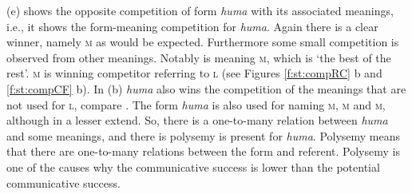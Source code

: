  (e) shows the opposite competition of form {\it huma} with its associated meanings, i.e., it shows the form-meaning competition for {\it huma}. Again there is a clear winner, namely {\scshape m} as would be expected. Furthermore some small competition is observed from other meanings. Notably is meaning {\scshape m}, which is `the best of the rest'. {\scshape m} is winning competitor referring to {\scshape l} (see Figures \ref{f:st:compRC} b and \ref{f:st:compCF} b). In  (b) {\it huma} also wins the competition of the meanings that are not used for {\scshape l}, compare .  The form {\it huma} is also used for naming {\scshape m}, {\scshape m} and {\scshape m}, although in a lesser extend. So, there is a one-to-many relation between {\it huma} and some meanings, and there is polysemy is present for {\it huma}. Polysemy means that there are one-to-many relations between the form and referent. Polysemy is one of the causes why the communicative success is lower than the potential communicative success.

